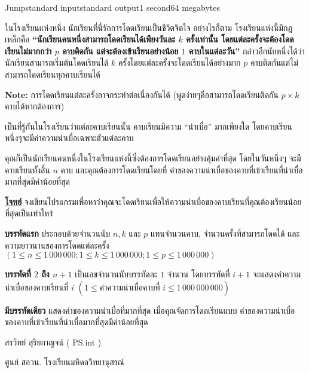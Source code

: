 \documentclass[11pt,a4paper]{article}
\begin{document}
\begin{problem}{Jump}{standard input}{standard output}{1 second}{64 megabytes}

ในโรงเรียนแห่งหนึ่ง นักเรียนที่นี่รักการโดดเรียนเป็นชีวิตจิตใจ อย่างไรก็ตาม โรงเรียนแห่งนี้มีกฎเหล็กคือ \textbf{“นักเรียนคนหนึ่งสามารถโดดเรียนได้เพียงวันละ $k$ ครั้งเท่านั้น โดยแต่ละครั้งจะต้องโดดเรียนไม่มากกว่า $p$ คาบติดกัน แต่จะต้องเข้าเรียนอย่างน้อย $1$ คาบในแต่ละวัน”} กล่าวอีกนัยหนึ่งได้ว่า นักเรียนสามารถเริ่มต้นโดดเรียนได้ $k$ ครั้งโดยแต่ละครั้งจะโดดเรียนได้อย่างมาก $p$ คาบติดกันแต่ไม่สามารถโดดเรียนทุกคาบเรียนได้

            \textbf{Note:} การโดดเรียนแต่ละครั้งอาจกระทำต่อเนื่องกันได้ (พูดง่ายๆคือสามารถโดดเรียนติดกัน $p \times k$ คาบได้หากต้องการ)

            เป็นที่รู้กันในโรงเรียนว่าแต่ละคาบเรียนนั้น คาบเรียนมีความ “น่าเบื่อ” มากเพียงใด โดยคาบเรียนหนึ่งๆจะมีค่าความน่าเบื่อเฉพาะตัวแต่ละคาบ

            คุณก็เป็นนักเรียนคนหนึ่งในโรงเรียนแห่งนี้ซึ่งต้องการโดดเรียนอย่างคุ้มค่าที่สุด โดยในวันหนึ่งๆ จะมีคาบเรียนทั้งสิ้น $n$ คาบ และคุณต้องการโดดเรียนโดยที่ ค่าของความน่าเบื่อของคาบที่เข้าเรียนที่น่าเบื่อมากที่สุดมีค่าน้อยที่สุด

\bigskip
\underline{\textbf{โจทย์}}  จงเขียนโปรแกรมเพื่อหาว่าคุณจะโดดเรียนเพื่อให้ความน่าเบื่อของคาบเรียนที่คุณต้องเรียนน้อยที่สุดเป็นเท่าไหร่


\InputFile

\textbf{บรรทัดแรก} ประกอบด้วยจำนวนนับ $n, k$ และ $p$ แทนจำนวนคาบ, จำนวนครั้งที่สามารถโดดได้ และความยาวนานของการโดดแต่ละครั้ง $( 1\leq n \leq 1\,000\,000 ; 1 \leq k \leq 1\,000\,000 ; 1 \leq p \leq 1\,000\,000 )$

\textbf{บรรทัดที่ $2$ ถึง $n+1$} เป็นเลขจำนวนนับบรรทัดละ $1$ จำนวน โดยบรรทัดที่ $i+1$ จะแสดงค่าความน่าเบื่อของคาบเรียนที่ $i$ $(1\leq \text{ค่าความน่าเบื่อคาบที่ }i \leq 1\,000\,000\,000)$


\OutputFile

\textbf{มีบรรทัดเดียว} แสดงค่าของความน่าเบื่อที่มากที่สุด เมื่อคุณจัดการโดดเรียนแบบ ค่าของความน่าเบื่อของคาบที่เข้าเรียนที่น่าเบื่อมากที่สุดมีค่าน้อยที่สุด

\Examples

\begin{example}
%
%
\end{example}

  
\Source

สรวิทย์  สุริยกาญจน์ ( PS.int )

ศูนย์ สอวน. โรงเรียนมหิดลวิทยานุสรณ์



\end{problem}
\end{document}
